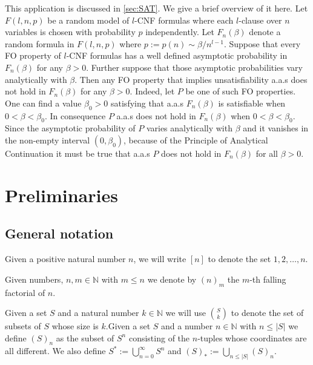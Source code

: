 \documentclass[12pt,notitlepage,a4paper]{article}
\theoremstyle{definition}
\newcommand{\N}{\mathbb{N}}
\begin{document}
This application is discussed in \cref{sec:SAT}. We give a brief overview
of it here. Let $F(l,n,p)$ be a random model of $l$-CNF 
formulas where each $l$-clause over $n$ variables is chosen with probability
$p$ independently. Let $F_n(\beta)$ denote a random formula in
$F(l,n,p)$ where $p:=p(n)\sim \beta/n^{l-1}$. 
Suppose that 
every FO property of $l$-CNF formulas 
has a well defined asymptotic probability in $F_n(\beta)$
for any $\beta>0$.
Further suppose that those asymptotic probabilities vary analytically
with $\beta$. Then any FO property that implies unsatisfiability
a.a.s does not hold in $F_n(\beta)$ for any
$\beta>0$. Indeed, let $P$ be one of such FO properties. One can find a
value $\beta_0>0$ satisfying that 
a.a.s $F_n(\beta)$ is satisfiable when $0<\beta<\beta_0$.
In consequence $P$ a.a.s does not hold
in $F_n(\beta)$ when $0<\beta<\beta_0$.
Since the asymptotic probability of $P$ varies analytically
with $\beta$ and it vanishes in the non-empty interval $(0,\beta_0)$,
because of the Principle of Analytical Continuation
it must be true that a.a.s $P$ does not hold in $F_n(\beta)$ for all
$\beta>0$.




\section{Preliminaries}

\subsection{General notation}\label{subsect:notation}

Given a positive natural number $n$, we will write
$[n]$ to denote the set ${1,2,\dots,n}$.\par
Given numbers, $n,m\in \N$ with $m\leq n$ we denote by
$(n)_m$ the $m$-th falling factorial of $n$. \par
Given a set $S$ and a natural number $k\in \N$
we will use $\binom{S}{k}$ to denote the set of 
subsets of $S$ whose size is $k$.Given a set
$S$ and a number $n\in \N$ with $n\leq |S|$ we define
$(S)_n$ as the subset of $S^n$ consisting of the $n$-tuples
whose coordinates are all different. 
We also define $S^*:=\bigcup_{n=0}^\infty S^n$ and
$(S)_*:=\bigcup_{n\leq |S|} (S)_n$. \par
\end{document}
